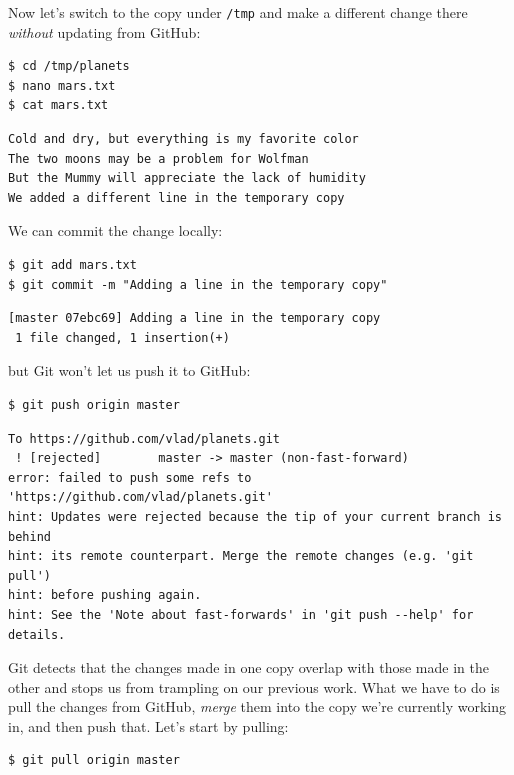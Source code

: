 \documentclass[]{book}
\newcommand{\gdef}[2]{\emph{#2}}
\begin{document}
Now let's switch to the copy under \texttt{/tmp} and make a different
change there \emph{without} updating from GitHub:

\begin{verbatim}
$ cd /tmp/planets
$ nano mars.txt
$ cat mars.txt
\end{verbatim}

\begin{verbatim}
Cold and dry, but everything is my favorite color
The two moons may be a problem for Wolfman
But the Mummy will appreciate the lack of humidity
We added a different line in the temporary copy
\end{verbatim}

We can commit the change locally:

\begin{verbatim}
$ git add mars.txt
$ git commit -m "Adding a line in the temporary copy"
\end{verbatim}

\begin{verbatim}
[master 07ebc69] Adding a line in the temporary copy
 1 file changed, 1 insertion(+)
\end{verbatim}

but Git won't let us push it to GitHub:

\begin{verbatim}
$ git push origin master
\end{verbatim}

\begin{verbatim}
To https://github.com/vlad/planets.git
 ! [rejected]        master -> master (non-fast-forward)
error: failed to push some refs to 'https://github.com/vlad/planets.git'
hint: Updates were rejected because the tip of your current branch is behind
hint: its remote counterpart. Merge the remote changes (e.g. 'git pull')
hint: before pushing again.
hint: See the 'Note about fast-forwards' in 'git push --help' for details.
\end{verbatim}

Git detects that the changes made in one copy overlap with those made in
the other and stops us from trampling on our previous work. What we have
to do is pull the changes from GitHub,
\gdef{g:repository-merge}{merge} them into the copy we're currently
working in, and then push that. Let's start by pulling:

\begin{verbatim}
$ git pull origin master
\end{verbatim}
\end{document}
